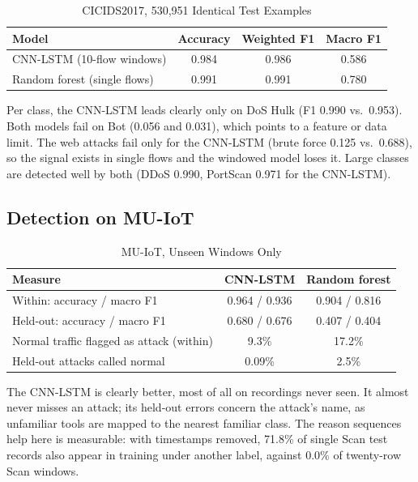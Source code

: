 \documentclass[conference]{IEEEtran}
\begin{document}
\begin{table}[htbp]
\caption{CICIDS2017, 530{,}951 Identical Test Examples}
\begin{center}
\footnotesize
\begin{tabularx}{\columnwidth}{|Y|c|c|c|}
\hline
\textbf{Model} & \textbf{Accuracy} & \textbf{Weighted F1} & \textbf{Macro F1}\\
\hline
CNN-LSTM (10-flow windows)   & 0.984 & 0.986 & 0.586\\
\hline
Random forest (single flows) & 0.991 & 0.991 & 0.780\\
\hline
\end{tabularx}
\label{tab:cicids}
\end{center}
\end{table}

Per class, the CNN-LSTM leads clearly only on DoS Hulk (F1 0.990 vs.\ 0.953).
Both models fail on Bot (0.056 and 0.031), which points to a feature or data
limit. The web attacks fail only for the CNN-LSTM (brute force 0.125 vs.\
0.688), so the signal exists in single flows and the windowed model loses it.
Large classes are detected well by both (DDoS 0.990, PortScan 0.971 for the
CNN-LSTM).

\subsection{Detection on MU-IoT}

\begin{table}[htbp]
\caption{MU-IoT, Unseen Windows Only}
\begin{center}
\footnotesize
\begin{tabularx}{\columnwidth}{|Y|c|c|}
\hline
\textbf{Measure} & \textbf{CNN-LSTM} & \textbf{Random forest}\\
\hline
Within: accuracy / macro F1             & 0.964 / 0.936 & 0.904 / 0.816\\
\hline
Held-out: accuracy / macro F1           & 0.680 / 0.676 & 0.407 / 0.404\\
\hline
Normal traffic flagged as attack (within) & 9.3\% & 17.2\%\\
\hline
Held-out attacks called normal          & 0.09\% & 2.5\%\\
\hline
\end{tabularx}
\label{tab:muiot}
\end{center}
\end{table}

The CNN-LSTM is clearly better, most of all on recordings never seen. It
almost never misses an attack; its held-out errors concern the attack's name,
as unfamiliar tools are mapped to the nearest familiar class. The reason
sequences help here is measurable: with timestamps removed, 71.8\% of single
Scan test records also appear in training under another label, against 0.0\%
of twenty-row Scan windows.
\end{document}
